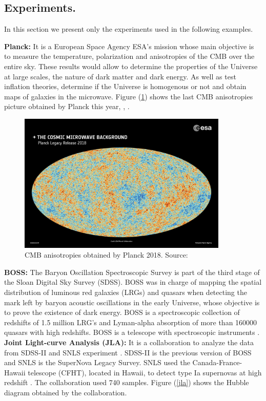 \documentclass[onecolumn,           %
               showpacs,            %
               preprintnumbers,     %
               aps,                 %
               prl,          	    %
               letterpaper,             %
               superscriptaddress,      %
               nofootinbib,         %
               tightenlines,        %
               floats,floatfix      %
               ,usenatbib,
               ]{revtex4-1}
\begin{document}
\subsection{Experiments.}
In this section we present only the experiments used in the following examples.

\textbf{Planck:} It is a European Space Agency ESA's mission whose main objective is to measure the temperature, polarization and anisotropies of the CMB over the entire sky. These results would allow to determine the properties of the Universe at large scales, the nature of dark matter and dark energy. As well as test inflation theories, determine if the Universe is homogenous or not and obtain maps of galaxies in the microwave. Figure (\ref{CMBPlanck}) shows the last CMB anisotropies picture obtained by Planck this year\cite{Planck1}, \cite{Planck2}, \cite{Planck3}.\\

\begin{figure}[h]
	\centering
	\includegraphics[width=10cm]{FiguresCosmo/CMB.jpg}	
	\caption{CMB anisotropies obtained by Planck 2018. Source:\cite{Planck4}}
	\label{CMBPlanck}
\end{figure}

\textbf{BOSS:} The Baryon Oscillation Spectroscopic Survey is part of the third stage of the Sloan Digital Sky Survey (SDSS). BOSS was in charge of mapping the spatial distribution of luminous red galaxies (LRGs) and quasars when detecting the mark left by baryon acoustic oscillations in the early Universe, whose objective is to prove the existence of dark energy. BOSS is a spectroscopic collection of redshifts of 1.5 million LRG's and Lyman-alpha absorption of more than 160000 quasars with high redshifts. BOSS is a telescope with spectroscopic instruments \cite{boss}.\\

\textbf{Joint Light-curve Analysis (JLA):} It is a collaboration to analyze the data from SDSS-II and SNLS experiment \cite{jla}. SDSS-II is the previous version of BOSS and SNLS is the SuperNova Legacy Survey. SNLS used the Canada-France-Hawaii telescope (CFHT), located in Hawaii, to detect type Ia supernovas at high redshift \cite{snls}. The collaboration used 740 samples. Figure (\ref{jla}) shows the Hubble diagram obtained by the collaboration.
\end{document}

